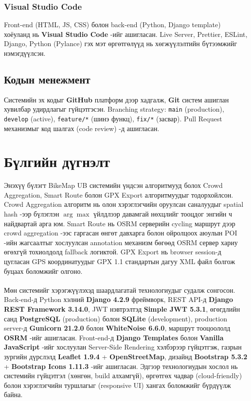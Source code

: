 \subsubsection{Visual Studio Code}
Front-end (HTML, JS, CSS) болон back-end (Python, Django template) хоёуланд нь \textbf{Visual Studio Code} -ийг ашигласан. Live Server, Prettier, ESLint, Django, Python (Pylance) гэх мэт өргөтгөлүүд нь хөгжүүлэлтийн бүтээмжийг нэмэгдүүлсэн.

\subsection{Кодын менежмент}
Системийн эх кодыг \textbf{GitHub} платформ дээр хадгалж, \textbf{Git} систем ашиглан хувилбар удирдлагыг гүйцэтгэсэн. Branching strategy: \texttt{main} (production), \texttt{develop} (active), \texttt{feature/*} (шинэ функц), \texttt{fix/*} (засвар). Pull Request механизмыг код шалгах (code review) -д ашигласан.

\section{Бүлгийн дүгнэлт}
\paragraph{}
Энэхүү бүлэгт BikeMap UB системийн үндсэн алгоритмууд болох Crowd Aggregation, Smart Route болон GPX Export алгоритмуудыг тодорхойлсон. Crowd Aggregation алгоритм нь олон хэрэглэгчийн оруулсан саналуудыг spatial hash -ээр бүлэглэн $\arg\max$ үйлдлээр давамгай нөхцлийг тооцдог энгийн ч найдвартай арга юм. Smart Route нь OSRM серверийн cycling маршрут дээр crowd aggregation -ээс гаргасан өнгөт давхарга болон ойролцоох аюулын POI -ийн жагсаалтыг хослуулсан annotation механизм бөгөөд OSRM сервер хариу өгөхгүй тохиолдолд fallback логиктой. GPX Export нь browser session-д цугласан GPS координатуудыг GPX 1.1 стандартын дагуу XML файл болгож буцаах боломжийг олгоно.

\paragraph{}
Мөн системийг хэрэгжүүлэхэд шаардлагатай технологиудыг судалж сонгосон. Back-end-д Python хэлний \textbf{Django 4.2.9} фреймворк, REST API-д \textbf{Django REST Framework 3.14.0}, JWT нэвтрэлтэд \textbf{Simple JWT 5.3.1}, өгөгдлийн санд \textbf{PostgreSQL} (production) болон \textbf{SQLite} (development), production server-д \textbf{Gunicorn 21.2.0} болон \textbf{WhiteNoise 6.6.0}, маршрут тооцоололд \textbf{OSRM} -ийг ашигласан. Front-end-д \textbf{Django Templates} болон \textbf{Vanilla JavaScript} -ийг хослуулан Server-Side Rendering хэлбэрээр гүйцэтгэж, газрын зургийн дүрслэлд \textbf{Leaflet 1.9.4} + \textbf{OpenStreetMap}, дизайнд \textbf{Bootstrap 5.3.2} + \textbf{Bootstrap Icons 1.11.3} -ийг ашигласан. Эдгээр технологиудын хослол нь системийн гүйцэтгэл (хөнгөн, build алхамгүй), өргөтгөх чадвар (cloud-friendly) болон хэрэглэгчийн туршлагыг (responsive UI) хангах боломжийг бүрдүүлж байна.
